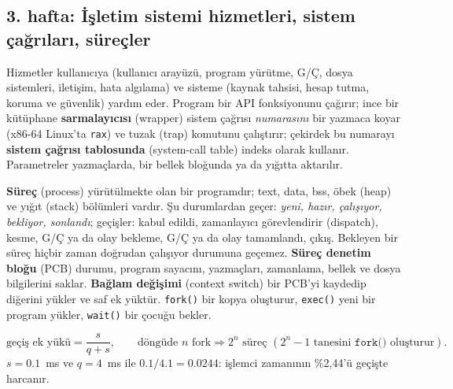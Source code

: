\documentclass[11pt,a4paper]{article}
\newcommand{\term}[1]{\textbf{\color{mintdeep}#1}}
\newcommand{\cmd}[1]{\texttt{#1}}
\begin{document}
\subsection{3. hafta: İşletim sistemi hizmetleri, sistem çağrıları, süreçler}
Hizmetler kullanıcıya (kullanıcı arayüzü, program yürütme, G/Ç, dosya sistemleri, iletişim, hata algılama) ve sisteme (kaynak tahsisi, hesap tutma, koruma ve güvenlik) yardım eder. Program bir API fonksiyonunu çağırır; ince bir kütüphane \term{sarmalayıcısı} (wrapper) sistem çağrısı \emph{numarasını} bir yazmaca koyar (x86-64 Linux'ta \texttt{rax}) ve tuzak (trap) komutunu çalıştırır; çekirdek bu numarayı \term{sistem çağrısı tablosunda} (system-call table) indeks olarak kullanır. Parametreler yazmaçlarda, bir bellek bloğunda ya da yığıtta aktarılır.

\term{Süreç} (process) yürütülmekte olan bir programdır; text, data, bss, öbek (heap) ve yığıt (stack) bölümleri vardır. Şu durumlardan geçer: \emph{yeni, hazır, çalışıyor, bekliyor, sonlandı}; geçişler: kabul edildi, zamanlayıcı görevlendirir (dispatch), kesme, G/Ç ya da olay bekleme, G/Ç ya da olay tamamlandı, çıkış. Bekleyen bir süreç hiçbir zaman doğrudan çalışıyor durumuna geçemez. \term{Süreç denetim bloğu} (PCB) durumu, program sayacını, yazmaçları, zamanlama, bellek ve dosya bilgilerini saklar. \term{Bağlam değişimi} (context switch) bir PCB'yi kaydedip diğerini yükler ve saf ek yüktür. \cmd{fork()} bir kopya oluşturur, \cmd{exec()} yeni bir program yükler, \cmd{wait()} bir çocuğu bekler.
\begin{example}
\[
\text{geçiş ek yükü} = \frac{s}{q + s}, \qquad \text{döngüde } n \text{ fork} \Rightarrow 2^{n} \text{ süreç } (2^{n}-1 \text{ tanesini } \cmd{fork()} \text{ oluşturur}).
\]
$s = 0.1$~ms ve $q = 4$~ms ile $0.1/4.1 = 0.0244$: işlemci zamanının \%2,44'ü geçişte harcanır.
\end{example}
\end{document}
